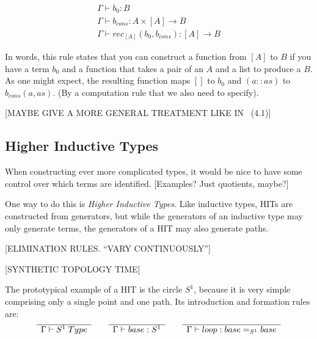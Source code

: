 \[
  \begin{array}{c}
    \Gamma \vdash b_0:B\\
    \Gamma \vdash b_{cons}: A \times [A] \rightarrow B\\
    \hline
    \Gamma \vdash rec_{[A]} (b_0, b_{cons}) : [A] \rightarrow B
  \end{array}
\]

In words, this rule states that you can construct a function from $[A]$ to $B$
if you have a term $b_0$ and a function that takes a pair of an $A$ and a list
to produce a $B$. As one might expect, the resulting function maps $[]$ to $b_0$
and $(a::as)$ to $b_{cons}(a,as)$. (By a computation rule that we also need to
specify).

[MAYBE GIVE A MORE GENERAL TREATMENT LIKE IN~\cite{Rijke2019} (4.1)]

\subsection{Higher Inductive Types}

When constructing ever more complicated types, it would be nice to have some
control over which terms are identified. [Examples? Just quotients, maybe?]

One way to do this is \emph{Higher Inductive Types}. Like inductive types, HITs
are constructed from generators, but while the generators of an inductive type
may only generate terms, the generators of a HIT may also generate paths.

[ELIMINATION RULES. ``VARY CONTINUOUSLY'']

[SYNTHETIC TOPOLOGY TIME]

The prototypical example of a HIT is the circle $S^1$, because it is very simple
comprising only a single point and one path. Its introduction and formation
rules are:
\begin{equation}
  \label{eq:circle}
  \begin{array}[t]{c}
    \hline
    \Gamma \vdash S^1 \; Type\\
  \end{array}
  \qquad
  \begin{array}[t]{c}
    \hline
    \Gamma \vdash base : S^1\\
  \end{array}
  \qquad
  \begin{array}[t]{c}
    \hline
    \Gamma \vdash loop : base =_{S^1} base
  \end{array}
\end{equation}